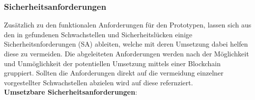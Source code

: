 \subsubsection{Sicherheitsanforderungen}
\label{sec:prototype_sec}
    Zusätzlich zu den funktionalen Anforderungen für den Prototypen, lassen sich aus den in  gefundenen Schwachstellen und Sicherheitslücken einige Sicherheitsnforderungen (SA) ableiten, welche mit deren Umsetzung dabei helfen diese zu vermeiden.
    Die abgeleiteten Anforderungen werden nach der Möglichkeit und Unmöglichkeit der potentiellen Umsetzung mittels einer Blockchain gruppiert.
    Sollten die Anforderungen direkt auf die vermeidung einzelner vorgestellter Schwachstellen abzielen wird auf diese refernziert.
    \bigskip\\
    \noindent \textbf{Umsetzbare Sicherheitsanforderungen}:
